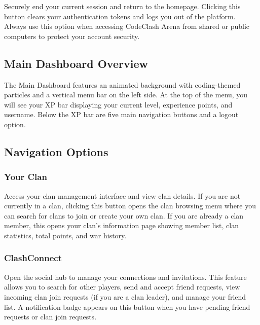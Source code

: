 \documentclass[12pt,a4paper]{article}
\begin{document}
Securely end your current session and return to the homepage. Clicking this button clears your authentication tokens and logs you out of the platform. Always use this option when accessing CodeClash Arena from shared or public computers to protect your account security.

\FloatBarrier


\subsection{Main Dashboard Overview}

The Main Dashboard features an animated background with coding-themed particles and a vertical menu bar on the left side. At the top of the menu, you will see your XP bar displaying your current level, experience points, and username. Below the XP bar are five main navigation buttons and a logout option.

\subsection{Navigation Options}

\subsubsection{Your Clan}

Access your clan management interface and view clan details. If you are not currently in a clan, clicking this button opens the clan browsing menu where you can search for clans to join or create your own clan. If you are already a clan member, this opens your clan's information page showing member list, clan statistics, total points, and war history.

\subsubsection{ClashConnect}

Open the social hub to manage your connections and invitations. This feature allows you to search for other players, send and accept friend requests, view incoming clan join requests (if you are a clan leader), and manage your friend list. A notification badge appears on this button when you have pending friend requests or clan join requests.
\end{document}
